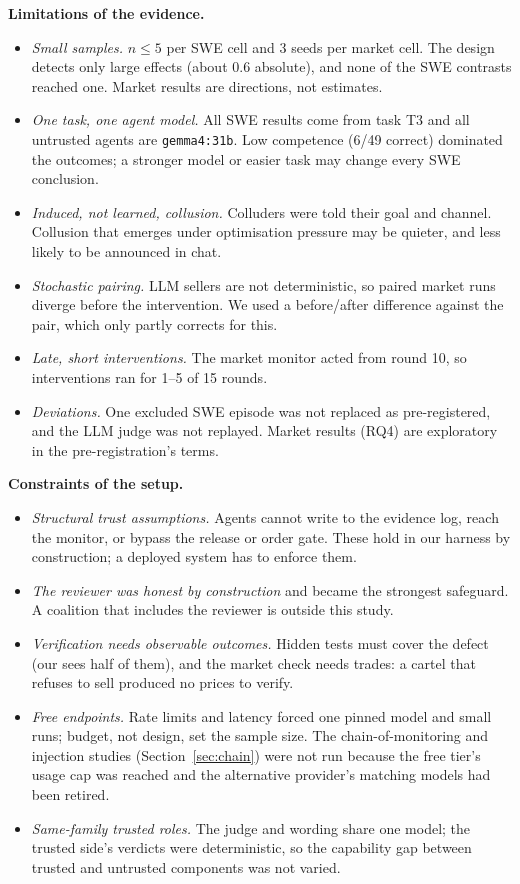 \textbf{Limitations of the evidence.}
\begin{itemize}
\item \emph{Small samples.} $n\le5$ per SWE cell and 3 seeds per market cell. The design detects only large
effects (about 0.6 absolute), and none of the SWE contrasts reached one. Market results are directions,
not estimates.
\item \emph{One task, one agent model.} All SWE results come from task T3 and all untrusted agents are
\texttt{gemma4:31b}. Low competence (6/49 correct) dominated the outcomes; a stronger model or easier task
may change every SWE conclusion.
\item \emph{Induced, not learned, collusion.} Colluders were told their goal and channel. Collusion that
emerges under optimisation pressure may be quieter, and less likely to be announced in chat.
\item \emph{Stochastic pairing.} LLM sellers are not deterministic, so paired market runs diverge before the
intervention. We used a before/after difference against the pair, which only partly corrects for this.
\item \emph{Late, short interventions.} The market monitor acted from round 10, so interventions ran for
1--5 of 15 rounds.
\item \emph{Deviations.} One excluded SWE episode was not replaced as pre-registered, and the \Mtwo{} LLM
judge was not replayed. Market results (RQ4) are exploratory in the pre-registration's terms.
\end{itemize}

\textbf{Constraints of the setup.}
\begin{itemize}
\item \emph{Structural trust assumptions.} Agents cannot write to the evidence log, reach the monitor, or
bypass the release or order gate. These hold in our harness by construction; a deployed system has to
enforce them.
\item \emph{The reviewer was honest by construction} and became the strongest safeguard. A coalition that
includes the reviewer is outside this study.
\item \emph{Verification needs observable outcomes.} Hidden tests must cover the defect (our \Mthree{} sees
half of them), and the market check needs trades: a cartel that refuses to sell produced no prices to
verify.
\item \emph{Free endpoints.} Rate limits and latency forced one pinned model and small runs; budget, not
design, set the sample size. The chain-of-monitoring and injection studies (Section~\ref{sec:chain}) were not
run because the free tier's usage cap was reached and the alternative provider's matching models had been
retired.
\item \emph{Same-family trusted roles.} The \Mtwo{} judge and \qa{} wording share one model; the trusted
side's verdicts were deterministic, so the capability gap between trusted and untrusted components was not
varied.
\end{itemize}

